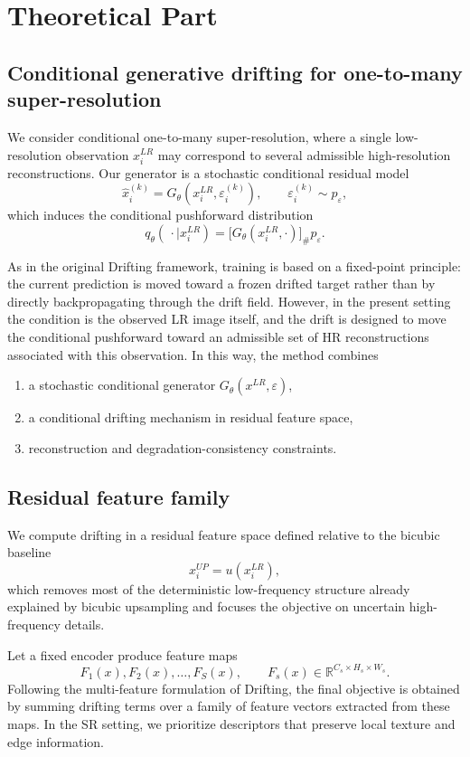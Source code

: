 \documentclass{article}
\begin{document}
\section{Theoretical Part}\label{sec:theory}

\subsection{Conditional generative drifting for one-to-many super-resolution}

We consider conditional one-to-many super-resolution, where a single low-resolution observation \(x_i^{LR}\) may correspond to several admissible high-resolution reconstructions. Our generator is a stochastic conditional residual model
\[
\hat{x}_i^{(k)} = G_{\theta}(x_i^{LR},\varepsilon_i^{(k)}),
\qquad
\varepsilon_i^{(k)} \sim p_{\varepsilon},
\]
which induces the conditional pushforward distribution
\[
q_{\theta}(\,\cdot\mid x_i^{LR})
=
\bigl[G_{\theta}(x_i^{LR},\cdot)\bigr]_{\#}p_{\varepsilon}.
\]

As in the original Drifting framework, training is based on a fixed-point principle: the current prediction is moved toward a frozen drifted target rather than by directly backpropagating through the drift field. However, in the present setting the condition is the observed LR image itself, and the drift is designed to move the conditional pushforward toward an admissible set of HR reconstructions associated with this observation. In this way, the method combines
\begin{enumerate}
    \item a stochastic conditional generator \(G_{\theta}(x^{LR},\varepsilon)\),
    \item a conditional drifting mechanism in residual feature space,
    \item reconstruction and degradation-consistency constraints.
\end{enumerate}

\subsection{Residual feature family}

We compute drifting in a residual feature space defined relative to the bicubic baseline
\[
x_i^{UP}=u(x_i^{LR}),
\]
which removes most of the deterministic low-frequency structure already explained by bicubic upsampling and focuses the objective on uncertain high-frequency details.

Let a fixed encoder produce feature maps
\[
F_1(x),F_2(x),\dots,F_S(x),
\qquad
F_s(x)\in\mathbb{R}^{C_s\times H_s\times W_s}.
\]
Following the multi-feature formulation of Drifting, the final objective is obtained by summing drifting terms over a family of feature vectors extracted from these maps. In the SR setting, we prioritize descriptors that preserve local texture and edge information.
\end{document}
